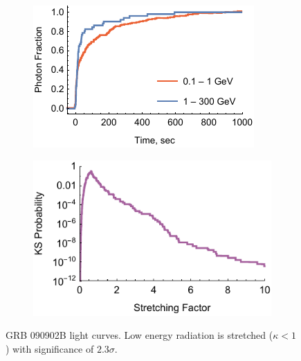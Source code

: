 \documentclass{article}
\begin{document}
\begin{figure}
        \centering
        \begin{subfigure}{0.49\textwidth}
                \includegraphics[width=\textwidth]{lightCurve090902B}
                \label{fig:lightCurve090902B}
        \end{subfigure}
        \begin{subfigure}{0.49\textwidth}
                \includegraphics[width=\textwidth]{probabilities090902B}
                \label{fig:probabilities090902B}
        \end{subfigure}
        \caption{GRB 090902B light curves. Low energy radiation is stretched ($\kappa < 1$) with significance of $2.3\sigma$.}
        \label{fig:grb090902B}
\end{figure}
\end{document}
